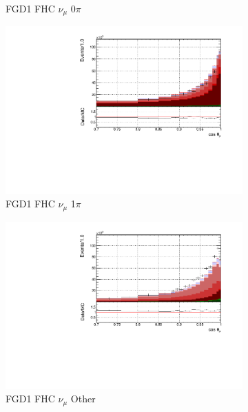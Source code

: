 \begin{figure}
\begin{subfigure}{.32\textwidth}
  \caption{FGD1 FHC $\nu_{\mu}$ 0$\pi$}
  \label{fig:tstack_FGD1_numuCC_0pi}
\end{subfigure}
\begin{subfigure}{.32\textwidth}
  \centering
  \includegraphics[width=0.95\linewidth]{figs/FGD1_numuCC_1pi_t}
  \caption{FGD1 FHC $\nu_{\mu}$ 1$\pi$}
  \label{fig:tstack_FGD1_numuCC_1pi}
\end{subfigure}
\begin{subfigure}{.32\textwidth}
  \centering
  \includegraphics[width=0.95\linewidth]{figs/FGD1_numuCC_other_t}
  \caption{FGD1 FHC $\nu_{\mu}$ Other}
  \label{fig:tstack_FGD1_numuCC_other}
\end{subfigure}
\centering
\begin{subfigure}{.32\textwidth}
  \centering

\end{subfigure}
\end{figure}
